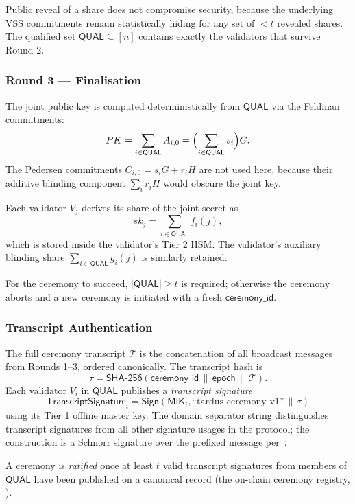 Public reveal of a share does not compromise security, because the underlying VSS commitments remain statistically hiding for any set of $< t$ revealed shares. The qualified set $\mathsf{QUAL} \subseteq [n]$ contains exactly the validators that survive Round 2.

\subsubsection{Round 3 --- Finalisation}
\label{sec:mint-dkg-r3}

The joint public key is computed deterministically from $\mathsf{QUAL}$ via the Feldman commitments:
\[
  PK = \sum_{i \in \mathsf{QUAL}} A_{i, 0} = \Bigl( \sum_{i \in \mathsf{QUAL}} s_i \Bigr) G.
\]
The Pedersen commitments $C_{i,0} = s_i G + r_i H$ are not used here, because their additive blinding component $\sum_i r_i H$ would obscure the joint key.

Each validator $V_j$ derives its share of the joint secret as
\[
  sk_j = \sum_{i \in \mathsf{QUAL}} f_i(j),
\]
which is stored inside the validator's Tier 2 HSM. The validator's auxiliary blinding share $\sum_{i \in \mathsf{QUAL}} g_i(j)$ is similarly retained.

For the ceremony to succeed, $|\mathsf{QUAL}| \geq t$ is required; otherwise the ceremony aborts and a new ceremony is initiated with a fresh $\mathsf{ceremony\_id}$.

\subsubsection{Transcript Authentication}
\label{sec:mint-dkg-transcript}

The full ceremony transcript $\mathcal{T}$ is the concatenation of all broadcast messages from Rounds 1--3, ordered canonically. The transcript hash is
\[
  \tau = \mathsf{SHA\text{-}256}(\mathsf{ceremony\_id} \,\|\, \mathsf{epoch} \,\|\, \mathcal{T}).
\]
Each validator $V_i$ in $\mathsf{QUAL}$ publishes a \emph{transcript signature}
\[
  \mathsf{TranscriptSignature}_i = \mathsf{Sign}(\mathsf{MIK}_i, \text{``tardus-ceremony-v1''} \,\|\, \tau)
\]
using its Tier 1 offline master key. The domain separator string distinguishes transcript signatures from all other signature usages in the protocol; the construction is a Schnorr signature over the prefixed message per~.

A ceremony is \emph{ratified} once at least $t$ valid transcript signatures from members of $\mathsf{QUAL}$ have been published on a canonical record (the on-chain ceremony registry, ).

